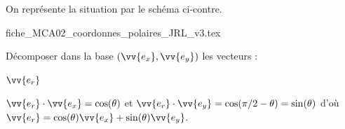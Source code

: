 \smallskip

On représente la situation par le schéma ci-contre.
                                \initialisationPartieDroite %
\begin{center}
{fiche_MCA02_coordonnes_polaires_JRL_v3.tex}
\end{center}
                               \finalisationDuPartageDePage %


\hauteurLargeurCadreReponse		{7mm}{4.5cm}
\initialisationEntrainement


Décomposer dans la base $(\vv{e_x}, \vv{e_y})$ les vecteurs : 

\debutEntrainement


\begin{enonce}
	$\vv{e_r}$
\end{enonce}


\begin{corrige}
  $\vv{e_r}\cdot\vv{e_x}=\cos(\theta)$ et  $\vv{e_r}\cdot\vv{e_y}=\cos(\pi/2-\theta)=\sin(\theta)$ d'où $\vv{e_r}=\cos(\theta) \vv{e_x} + \sin (\theta) \vv{e_y}$.
\end{corrige}


